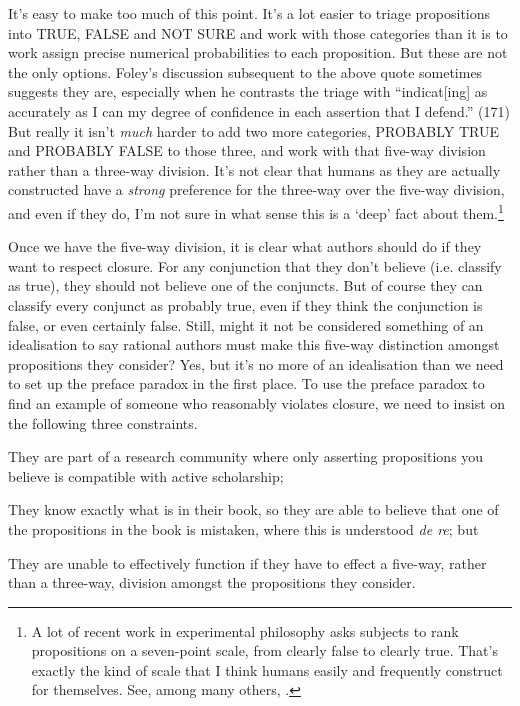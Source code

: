 It's easy to make too much of this point. It's a lot easier to triage propositions into TRUE, FALSE and NOT SURE and work with those categories than it is to work assign precise numerical probabilities to each proposition. But these are not the only options. Foley's discussion subsequent to the above quote sometimes suggests they are, especially when he contrasts the triage with ``indicat[ing] as accurately as I can my degree of confidence in each assertion that I defend.'' (171) But really it isn't \textit{much} harder to add two more categories, PROBABLY TRUE and PROBABLY FALSE to those three, and work with that five-way division rather than a three-way division. It's not clear that humans as they are actually constructed have a \textit{strong} preference for the three-way over the five-way division, and even if they do, I'm not sure in what sense this is a `deep' fact about them.\footnote{A lot of recent work in experimental philosophy asks subjects to rank propositions on a seven-point scale, from clearly false to clearly true. That's exactly the kind of scale that I think humans easily and frequently construct for themselves. See, among many others, \cite{FeltzZarpentine2010}.}

Once we have the five-way division, it is clear what authors should do if they want to respect closure. For any conjunction that they don't believe (i.e. classify as true), they should not believe one of the conjuncts. But of course they can classify every conjunct as probably true, even if they think the conjunction is false, or even certainly false. Still, might it not be considered something of an idealisation to say rational authors must make this five-way distinction amongst propositions they consider? Yes, but it's no more of an idealisation than we need to set up the preface paradox in the first place. To use the preface paradox to find an example of someone who reasonably violates closure, we need to insist on the following three constraints.

\begin{enumerate*}
\renewcommand{\labelenumi}{\alph{enumi})}
\item They are part of a research community where only asserting propositions you believe is compatible with active scholarship;
\item They know exactly what is in their book, so they are able to believe that one of the propositions in the book is mistaken, where this is understood \textit{de re}; but
\item They are unable to effectively function if they have to effect a five-way, rather than a three-way, division amongst the propositions they consider.
\end{enumerate*}

